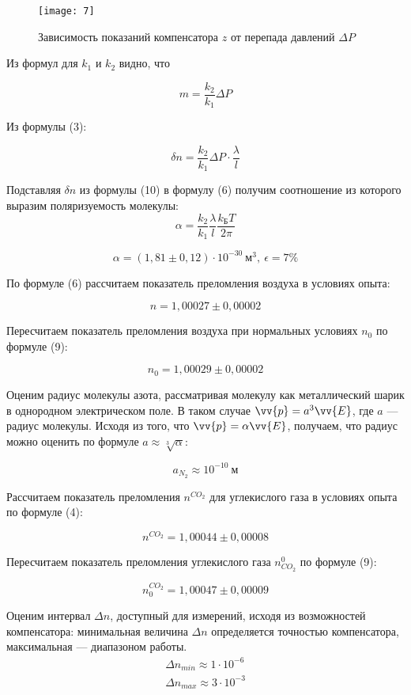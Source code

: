 \documentclass[a4paper, 12pt]{article}
\begin{document}
\begin{figure}[H]
    \texttt{[image: 7]} 
    \captionsetup{justification=centering}
    \caption{Зависимость показаний компенсатора $z$ от перепада давлений
    $\Delta P$}
\end{figure}

Из
формул для $k_1$ и $k_2$ видно, что

\[
    m = \frac{k_2}{k_1}\Delta P
\]

Из формулы (3): 

\begin{equation}
    \delta n = \frac{k_2}{k_1}\Delta P \cdot \frac{\lambda}{l}
\end{equation}

Подставляя $\delta n$ из формулы (10) в формулу (6) получим
соотношение из которого выразим поляризуемость молекулы:
\begin{equation}
    \alpha = \frac{k_2}{k_1} \frac{\lambda}{l} \frac{k_\text{Б}T}{2\pi}
\end{equation}

\[
    \alpha = (1,81\pm 0,12)\cdot 10^{-30}\ \text{м}^3, \: \epsilon = 7\%
\]

По формуле (6) рассчитаем показатель преломления воздуха в условиях
опыта:

\[
    n = 1,00027 \pm 0,00002
\]

Пересчитаем показатель преломления воздуха при нормальных условиях
$n_0$ по формуле (9):

\[
    n_0 = 1,00029 \pm 0,00002
\]

Оценим радиус молекулы азота, рассматривая молекулу как металлический
шарик в однородном электрическом поле. В таком случае $\vv{p} = a^3
\vv{E}$, где $a$ --- радиус молекулы. Исходя из того, что $\vv{p} =
\alpha \vv{E}$, получаем, что радиус можно оценить по формуле $a
\approx
\sqrt[3]{\alpha}$:

\[
    a_{N_2} \approx 10^{-10}\ \text{м} 
\]

Рассчитаем показатель преломления $n^{CO_2}$ для углекислого газа в
условиях опыта по формуле (4):

\[
    n^{CO_2} = 1,00044 \pm 0,00008
\]

Пересчитаем показатель преломления углекислого газа $n_{CO_2}^0$ по
формуле (9):

\[
    n_0^{CO_2} = 1,00047 \pm 0,00009
\]

Оценим интервал $\Delta n$, доступный для измерений, исходя из
возможностей компенсатора: минимальная величина $\Delta n$
определяется точностью компенсатора, максимальная --- диапазоном
работы. 
\begin{equation*}
    \begin{gathered}
        \Delta n_{min} \approx 1\cdot 10^{-6} \\
        \Delta n_{max} \approx 3 \cdot 10^{-3}
    \end{gathered}
\end{equation*}
\end{document}
